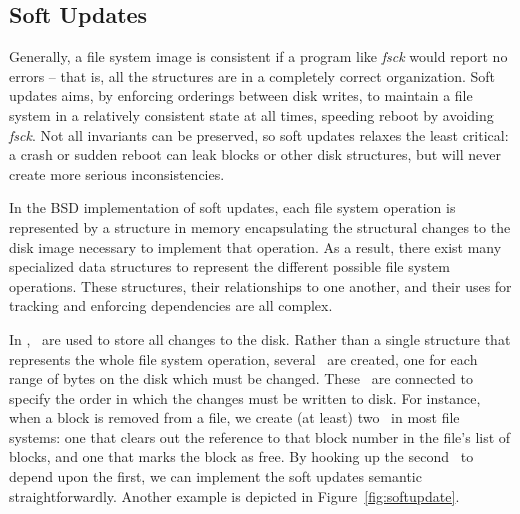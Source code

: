 \subsection {Soft Updates}
\label{sec:using:softupdate}

Generally, a file system image is consistent if a program like \emph{fsck}
would report no errors -- that is, all the structures are in a completely
correct organization.  
%
Soft updates aims, by enforcing orderings between disk writes, to maintain
a file system in a relatively consistent state at all times, speeding reboot
by avoiding \emph{fsck}.
%
Not all invariants can be preserved, so soft updates relaxes the least
critical: a crash or sudden reboot can leak blocks or other disk
structures, but will never create more serious inconsistencies.
%
%

In the BSD implementation of soft updates, each file system operation is
represented by a structure in memory encapsulating the structural changes to the
disk image necessary to implement that operation. As a result, there exist many
specialized data structures to represent the different possible file system
operations. These structures, their relationships to one another, and their uses
for tracking and enforcing dependencies are all complex.

In \Kudos, \chdescs\ are used to store all changes to the disk. Rather than a
single structure that represents the whole file system operation, several
\chdescs\ are created, one for each range of bytes on the disk which must be
changed. These \chdescs\ are connected to specify the order in which the changes
must be written to disk. For instance, when a block is removed from a file, we
create (at least) two \chdescs\ in most file systems: one that clears out the
reference to that block number in the file's list of blocks, and one that marks
the block as free. By hooking up the second \chdesc\ to depend upon the first,
we can implement the soft updates semantic straightforwardly. Another example is
depicted in Figure~\ref{fig:softupdate}.

